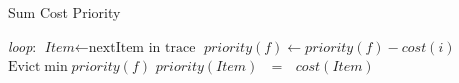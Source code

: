 
\begin{algorithm}
\caption{Sum Cost Priority}\label{euclid}
    \begin{algorithmic}[1]
        \BState \emph{loop}:
            \State $\textit{Item} \gets \text{nextItem in trace}$
                    \State $priority(f) \gets priority(f) - cost(i)$
            \EndFor
                    \State $\text{Evict} \min priority(f)$
            \EndIf
            \State $priority(Item) \textbf{ }= \textbf{ }cost(Item)$
    \end{algorithmic}
\end{algorithm}


